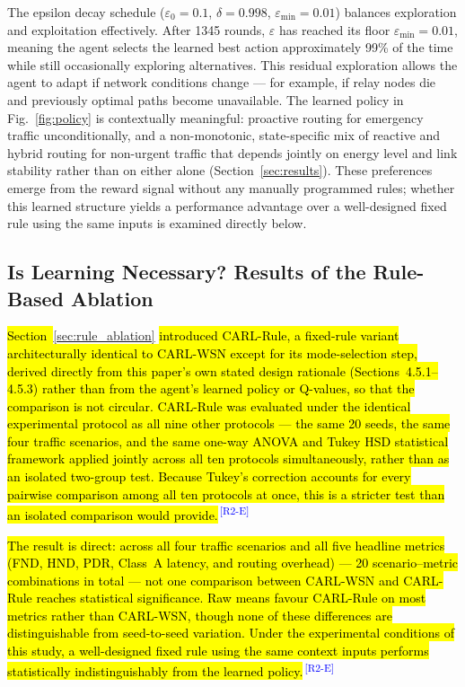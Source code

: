 \documentclass[12pt]{article}
\newcommand{\rtag}[1]{\textsuperscript{\textcolor{blue}{\scriptsize\,[#1]}}}
\newcommand{\hlx}[1]{{\exhyphenpenalty=10000\hyphenpenalty=10000\let\ \nobreakspace\hl{#1}}}
\begin{document}
The epsilon decay schedule ($\varepsilon_0 = 0.1$,
$\delta = 0.998$, $\varepsilon_{\min} = 0.01$) balances
exploration and exploitation effectively. After 1345 rounds, $\varepsilon$ has reached
its floor $\varepsilon_{\min} = 0.01$, meaning the agent selects the learned
best action approximately 99\% of the time while still occasionally exploring
alternatives. This residual
exploration allows the agent to adapt if network conditions change
--- for example, if relay nodes die and previously optimal paths become
unavailable. The learned policy in Fig.~\ref{fig:policy} is
contextually meaningful: proactive routing for emergency traffic
unconditionally, and a non-monotonic, state-specific mix of
reactive and hybrid routing for non-urgent traffic that depends
jointly on energy level and link stability rather than on either
alone (Section~\ref{sec:results}). These preferences emerge from the
reward signal without any manually programmed rules; whether this
learned structure yields a performance advantage over a
well-designed fixed rule using the same inputs is examined directly
below.

\subsection{Is Learning Necessary? Results of the Rule-Based Ablation}
\label{sec:rule_ablation_results}

\hlx{Section~}\ref{sec:rule_ablation}\hlx{ introduced CARL-Rule, a fixed-rule
variant architecturally identical to CARL-WSN except for its
mode-selection step, derived directly from this paper's own stated
design rationale (Sections~4.5.1--4.5.3) rather than from the
agent's learned policy or Q-values, so that the comparison is not
circular. CARL-Rule was evaluated under the identical experimental
protocol as all nine other protocols --- the same 20 seeds, the same
four traffic scenarios, and the same one-way ANOVA and Tukey HSD
statistical framework applied jointly across all ten protocols
simultaneously, rather than as an isolated two-group test. Because
Tukey's correction accounts for every pairwise comparison among all
ten protocols at once, this is a stricter test than an isolated
comparison would provide.}\rtag{R2-E}

\hlx{The result is direct: across all four traffic scenarios and all five
headline metrics (FND, HND, PDR, Class~A latency, and routing
overhead) --- 20 scenario--metric combinations in total --- not one
comparison between CARL-WSN and CARL-Rule reaches statistical
significance. Raw means favour CARL-Rule on most metrics rather than
CARL-WSN, though none of these differences are distinguishable from
seed-to-seed variation. Under the experimental conditions of this
study, a well-designed fixed rule using the same context inputs
performs statistically indistinguishably from the learned policy.}\rtag{R2-E}
\end{document}
